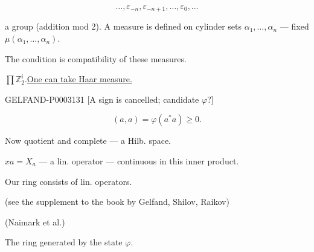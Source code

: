 \begin{equation*}\ldots,\varepsilon_{-n},\varepsilon_{-n+1},\ldots,\varepsilon_0,\ldots\end{equation*}

a group (addition mod 2). A measure is defined on cylinder sets $\alpha_1,\ldots,\alpha_n$ --- fixed $\mu (\alpha_1,\ldots,\alpha_n)$.

The condition is compatibility of these measures.

$\prod\mathbb Z_2^i$.\qquad\uline{\uline{One can take Haar measure.}}

\begin{GelfandAdjacentEvidence}{GELFAND-P000313}{1}
[A sign is cancelled; candidate $\varphi$?] 



\end{GelfandAdjacentEvidence}


\begin{equation*}(a, a)=\varphi (a^*a)\ge0.\end{equation*}

Now quotient and complete --- a Hilb. space.

$x a=X_a$ --- a lin. operator --- continuous in this inner product.





Our ring consists of lin. operators.

(see the supplement to the book by Gelfand, Shilov, Raikov)

(Naimark et al.)

The ring generated by the state $\varphi$.

